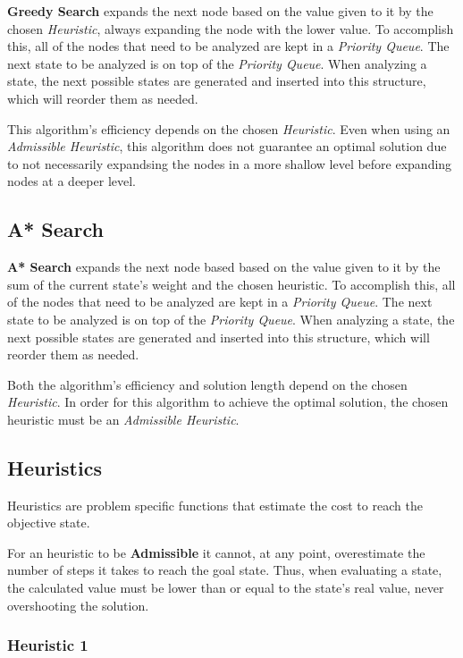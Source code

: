 \documentclass[conference]{IEEEtran}
\begin{document}
\textbf{Greedy Search} expands the next node based on the value given to it by the chosen \textit{Heuristic}, always expanding the node with the lower value. To accomplish this, all of the nodes that need to be analyzed are kept in a \textit{Priority Queue}. The next state to be analyzed is on top of the \textit{Priority Queue}. When analyzing a state, the next possible states are generated and inserted into this structure, which will reorder them as needed.

This algorithm's efficiency depends on the chosen \textit{Heuristic}. Even when using an \textit{Admissible Heuristic}, this algorithm does not guarantee an optimal solution due to not necessarily expandsing the nodes in a more shallow level before expanding nodes at a deeper level.

\subsection{A* Search}

\textbf{A* Search} expands the next node based based on the value given to it by the sum of the current state's weight and the chosen heuristic. To accomplish this, all of the nodes that need to be analyzed are kept in a \textit{Priority Queue}. The next state to be analyzed is on top of the \textit{Priority Queue}. When analyzing a state, the next possible states are generated and inserted into this structure, which will reorder them as needed.

Both the algorithm's efficiency and solution length depend on the chosen \textit{Heuristic}. In order for this algorithm to achieve the optimal solution, the chosen heuristic must be an \textit{Admissible Heuristic}.


\subsection{Heuristics}

Heuristics are problem specific functions that estimate the cost to reach the objective state.

For an heuristic to be \textbf{Admissible} it cannot, at any point, overestimate the number of steps it takes to reach the goal state. Thus, when evaluating a state, the calculated value must be lower than or equal to the state's real value, never overshooting the solution.

\subsubsection{Heuristic 1}
\end{document}
